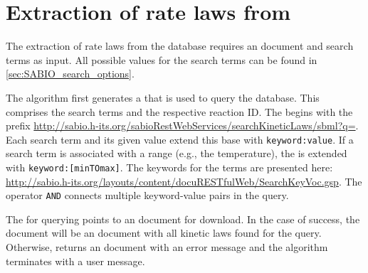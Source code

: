 \section{Extraction of rate laws from \SABIO}

The extraction of rate laws from the database \SABIO requires an \SBML document and search terms as input.
All possible values for the search terms can be found in \vref{sec:SABIO_search_options}.

The algorithm first generates a \URL that is used to query the \SABIO database.
This \URL comprises the search terms and the respective \KEGG reaction \ac{ID}.
The \URL begins with the prefix \url{http://sabio.h-its.org/sabioRestWebServices/searchKineticLaws/sbml?q=}.
Each search term and its given value extend this base \URL with \texttt{keyword:value}.
If a search term is associated with a range (e.g., the temperature), the \URL is extended with \texttt{keyword:[min\textvisiblespace{}TO\textvisiblespace{}max]}.
The keywords for the terms are presented here: \url{http://sabio.h-its.org/layouts/content/docuRESTfulWeb/SearchKeyVoc.gsp}.
The operator \texttt{\textvisiblespace{}AND\textvisiblespace} connects multiple keyword-value pairs in the query.

The \URL for querying points to an \XML document for download.
In the case of success, the \XML document will be an \SBML document with all kinetic laws found for the query.
Otherwise, \SABIO returns an \XML document with an error message and the algorithm terminates with a user message.

